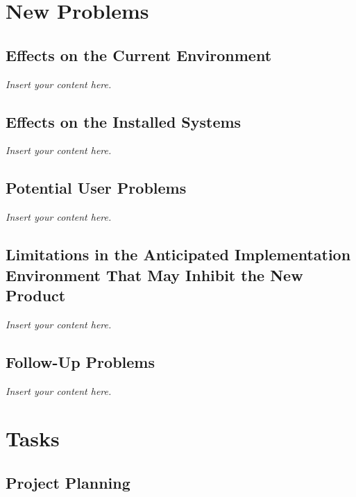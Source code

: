 \documentclass[12pt]{article}
\newcommand{\lips}{\textit{Insert your content here.}}
\begin{document}
\section{New Problems}
\subsection{Effects on the Current Environment}
\lips
\subsection{Effects on the Installed Systems}
\lips
\subsection{Potential User Problems}
\lips
\subsection{Limitations in the Anticipated Implementation Environment That May
Inhibit the New Product}
\lips
\subsection{Follow-Up Problems}
\lips

\section{Tasks}
\subsection{Project Planning}
\end{document}
